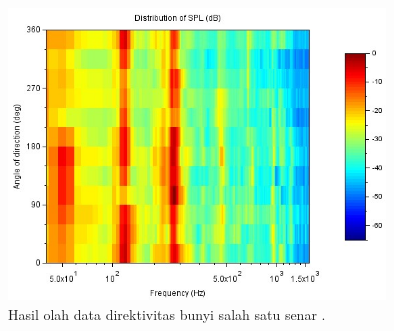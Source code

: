 \begin{figure}[t!]
    \centering
    \includegraphics[width=10cm]{Gambar/contohDataDirektivitas.jpg}
    \caption{Hasil olah data direktivitas bunyi salah satu senar \bundengan \cite{prosidingDirektivitas}.}
    \label{fig:contohDataDirektivitas}
\end{figure}

